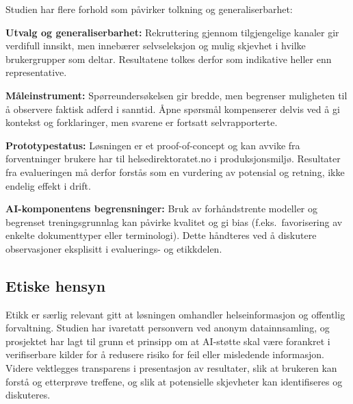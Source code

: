 Studien har flere forhold som påvirker tolkning og generaliserbarhet:

\textbf{Utvalg og generaliserbarhet:} Rekruttering gjennom tilgjengelige kanaler gir verdifull innsikt, men innebærer selvseleksjon og mulig skjevhet i hvilke brukergrupper som deltar. Resultatene tolkes derfor som indikative heller enn representative.

\textbf{Måleinstrument:} Spørreundersøkelsen gir bredde, men begrenser muligheten til å observere faktisk adferd i sanntid. Åpne spørsmål kompenserer delvis ved å gi kontekst og forklaringer, men svarene er fortsatt selvrapporterte.

\textbf{Prototypestatus:} Løsningen er et proof-of-concept og kan avvike fra forventninger brukere har til helsedirektoratet.no i produksjonsmiljø. Resultater fra evalueringen må derfor forstås som en vurdering av potensial og retning, ikke endelig effekt i drift. \cite{ProjectPlan}

\textbf{AI-komponentens begrensninger:} Bruk av forhåndstrente modeller og begrenset treningsgrunnlag kan påvirke kvalitet og gi bias (f.eks.\ favorisering av enkelte dokumenttyper eller terminologi). Dette håndteres ved å diskutere observasjoner eksplisitt i evaluerings- og etikkdelen. \cite{ProjectPlan}

\subsection{Etiske hensyn}
\label{sec:etikk}

Etikk er særlig relevant gitt at løsningen omhandler helseinformasjon og offentlig forvaltning. Studien har ivaretatt personvern ved anonym datainnsamling, og prosjektet har lagt til grunn et prinsipp om at AI-støtte skal være forankret i verifiserbare kilder for å redusere risiko for feil eller misledende informasjon. Videre vektlegges transparens i presentasjon av resultater, slik at brukeren kan forstå og etterprøve treffene, og slik at potensielle skjevheter kan identifiseres og diskuteres.
